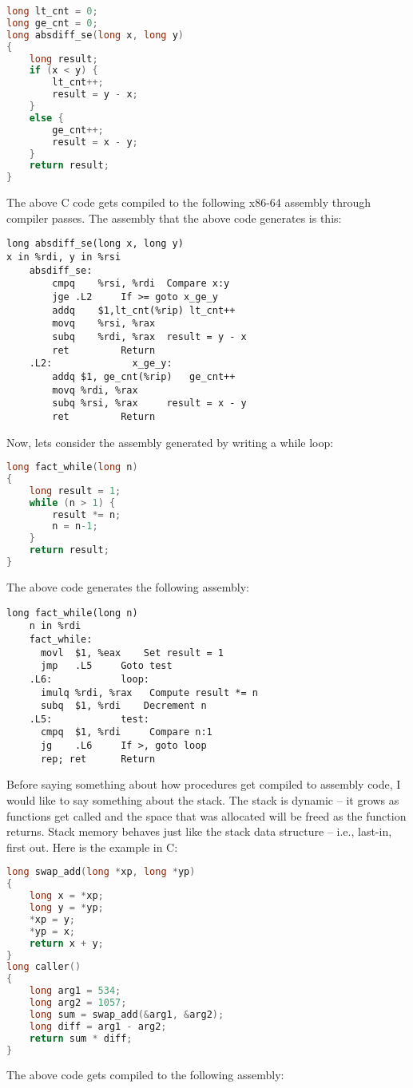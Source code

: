 \documentclass{amsbook}
\begin{document}
\begin{lstlisting}[language=C]
long lt_cnt = 0;
long ge_cnt = 0;
long absdiff_se(long x, long y)
{
	long result;
	if (x < y) {
		lt_cnt++;
		result = y - x;
	}
	else {
		ge_cnt++;
		result = x - y;
	}
	return result;
}

\end{lstlisting} 

The above C code gets compiled to the following x86-64 assembly through compiler passes. The assembly that the above code generates is this: 

\begin{lstlisting}
long absdiff_se(long x, long y)
x in %rdi, y in %rsi
	absdiff_se:
		cmpq	%rsi, %rdi	Compare x:y
		jge	.L2		If >= goto x_ge_y
		addq	$1,lt_cnt(%rip)	lt_cnt++
		movq	%rsi, %rax
		subq	%rdi, %rax	result = y - x
		ret			Return
	.L2:			  x_ge_y:
		addq $1, ge_cnt(%rip)	ge_cnt++
		movq %rdi, %rax
		subq %rsi, %rax		result = x - y
		ret			Return

\end{lstlisting}

Now, lets consider the assembly generated by writing a while loop: 

\begin{lstlisting}[language=C]
long fact_while(long n)
{
	long result = 1;
	while (n > 1) {
		result *= n;
		n = n-1;
	}
	return result;
}

\end{lstlisting}

The above code generates the following assembly:

\begin{lstlisting}
long fact_while(long n)
	n in %rdi
	fact_while:
	  movl	$1, %eax	Set result = 1
	  jmp	.L5		Goto test
	.L6:		    loop:
	  imulq	%rdi, %rax	 Compute result *= n
	  subq	$1, %rdi	Decrement n
	.L5:		    test:
	  cmpq	$1, %rdi	 Compare n:1
	  jg	.L6		If >, goto loop
	  rep; ret		Return
\end{lstlisting}

Before saying something about how procedures get compiled to assembly code, I would like to say something about the stack. The stack is dynamic -- it grows as functions get called and the space that was allocated will be freed as the function returns. Stack memory behaves just like the stack data structure -- i.e., last-in, first out. 
Here is the example in C:

\begin{lstlisting}[language=C]
long swap_add(long *xp, long *yp)
{
	long x = *xp;
	long y = *yp;
	*xp = y;
	*yp = x;
	return x + y;
}
long caller()
{
	long arg1 = 534;
	long arg2 = 1057;
	long sum = swap_add(&arg1, &arg2);
	long diff = arg1 - arg2;
	return sum * diff;
}
\end{lstlisting}
The above code gets compiled to the following assembly: 
\end{document}
